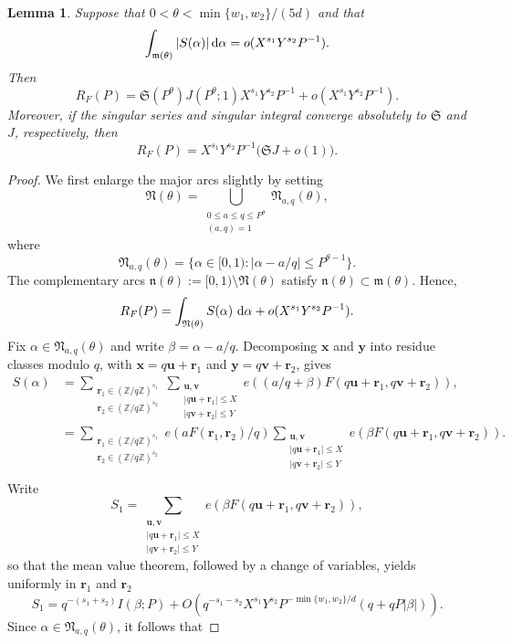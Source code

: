 \documentclass[12pt,reqno]{amsart}
\newtheorem{lemma}[theorem]{Lemma}
\theoremstyle{definition}
\theoremstyle{remark}
\numberwithin{equation}{section}
\def\bfr{{\mathbf r}}
\def\bfu{{\mathbf u}}
\def\bfv{{\mathbf v}}
\def\bfx{{\mathbf x}}
\def\bfy{{\mathbf y}}
\def\Z{{\mathbb Z}}\def\Q{{\mathbb Q}}
\def\grm{{\mathfrak m}}\def\grM{{\mathfrak M}}
\def\grN{{\mathfrak N}}\def\grn{{\mathfrak n}}
\def\grS{{\mathfrak S}}\def\grP{{\mathfrak P}}
\def\a{{\alpha}} \def\bfalp{{\boldsymbol \alpha}} \def\atil{{\widetilde \alpha}}
\def\b{{\beta}}  \def\bfbet{{\boldsymbol \beta}}
\def\le{\leqslant} \def\ge{\geqslant} \def\pleq{\preccurlyeq} \def\ple{\prec}
\def\d{{\,{\rm d}}}
\begin{document}
\begin{lemma}\label{lemma: circlemethod dissection}
    Suppose that $0<\theta<\min\{w_1,w_2\}/(5d)$ and that
    \[\int_{\grm(\theta)}|S(\a)| \d \a = o(X^{s_1}Y^{s_2}P^{-1}).\]
    Then
    \[R_F(P) = \grS(P^{\theta}) J(P^{\theta};1) X^{s_1}Y^{s_2}P^{-1} + o(X^{s_1}Y^{s_2}P^{-1}).\]
    Moreover, if the singular series and singular integral converge
    absolutely to $\grS$ and $J$, respectively, then
    \[
        R_F(P)=X^{s_1}Y^{s_2}P^{-1}\bigl(\grS J+o(1)\bigr).
    \]
\end{lemma}
\begin{proof}
    We first enlarge the major arcs slightly by setting
    \[\grN(\theta) = \bigcup_{\substack{0 \le a \le q \le P^{\theta} \\ (a,q) = 1}}\grN_{a,q}(\theta),\]
where
\[\grN_{a,q}(\theta) = \{\a \in [0,1): |\a - a/q| \le P^{\theta - 1}\}.\]
The complementary arcs $\grn(\theta):=[0,1)\setminus\grN(\theta)$ satisfy
$\grn(\theta)\subset\grm(\theta)$. Hence,
\[
    R_F(P)=\int_{\grN(\theta)}S(\a)\,\d\a
    +o(X^{s_1}Y^{s_2}P^{-1}).
\]
Fix $\a\in\grN_{a,q}(\theta)$ and write $\b=\a-a/q$. Decomposing
$\bfx$ and $\bfy$ into residue classes modulo $q$, with
$\bfx=q\bfu+\bfr_1$ and $\bfy=q\bfv+\bfr_2$, gives
\begin{align*}
    S(\a) &= \sum_{\substack{\bfr_1 \in (\Z/q\Z)^{s_1} \\ \bfr_2 \in (\Z/q\Z)^{s_2}}} \sum_{\substack{\bfu,\bfv \\ |q \bfu + \bfr_1| \le X \\ |q \bfv + \bfr_2| \le Y}} e((a/q+\b)F(q \bfu + \bfr_1,q \bfv + \bfr_2)), \\
    &= \sum_{\substack{\bfr_1 \in (\Z/q\Z)^{s_1} \\ \bfr_2 \in (\Z/q\Z)^{s_2}}} e(aF(\bfr_1,\bfr_2)/q)\sum_{\substack{\bfu,\bfv \\ |q \bfu + \bfr_1| \le X \\ |q \bfv + \bfr_2| \le Y}} e(\b F(q \bfu + \bfr_1,q \bfv + \bfr_2)). \\
\end{align*}
Write
\[S_1 = \sum_{\substack{\bfu,\bfv \\ |q \bfu + \bfr_1| \le X \\ |q \bfv + \bfr_2| \le Y}} e(\b F(q \bfu + \bfr_1,q \bfv + \bfr_2)),\]
so that the mean value theorem, followed by a change of variables, yields uniformly
in $\bfr_1$ and $\bfr_2$
\[
S_1=q^{-(s_1+s_2)}I(\b;P)
+O\left(q^{-s_1-s_2}X^{s_1}Y^{s_2}P^{-\min\{w_1,w_2\}/d}
(q+qP|\b|)\right).
\]
Since $\a\in\grN_{a,q}(\theta)$, it follows that

\end{proof}
\end{document}
